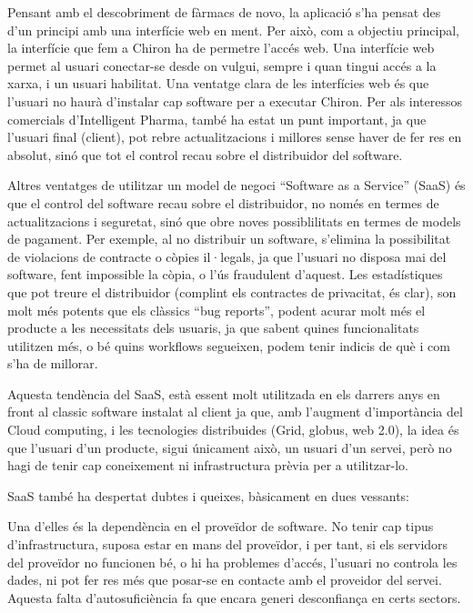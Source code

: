 \documentclass[titlepage,a4paper,12pt]{book}
\begin{document}
Pensant amb el descobriment de fàrmacs de novo, la aplicació s'ha pensat des
d'un principi amb una interfície web en ment.  Per això, com a objectiu
principal, la interfície que fem a Chiron ha de permetre l'accés web.  Una
interfície web permet al usuari conectar-se desde on vulgui, sempre i quan
tingui accés a la xarxa, i un usuari habilitat.  Una ventatge clara de les
interfícies web és que l'usuari no haurà d'instalar cap software per a executar
Chiron.  Per als interessos comercials d'Intelligent Pharma, també ha estat un
punt important, ja que l'usuari  final (client), pot rebre actualitzacions i
millores sense haver de fer res en absolut, sinó que tot el control recau sobre
el distribuidor del software.

Altres ventatges de utilitzar un model de negoci ``Software as a Service''
(SaaS) és que el control del software recau sobre el distribuidor, no només en
termes de actualitzacions i seguretat, sinó que obre noves possiblilitats en
termes de models de pagament.   Per exemple, al no distribuir un software,
	   s'elimina la possibilitat de violacions de contracte o còpies il·legals, ja que
	   l'usuari no disposa mai del software, fent impossible la còpia, o l'ús
	   fraudulent d'aquest.  Les estadístiques que pot treure el distribuidor (complint
			   els contractes de privacitat, és clar), son molt més potents que els clàssics
	   ``bug reports'', podent acurar molt més el producte a les necessitats dels
	   usuaris, ja que sabent quines funcionalitats utilitzen més, o bé quins workflows
	   segueixen, podem tenir indicis de què i com s'ha de millorar.

	   Aquesta tendència del SaaS, està essent molt utilitzada en els darrers anys en
	   front al classic software instalat al client ja que, amb l'augment d'importància
	   del Cloud computing, i les tecnologies distribuides (Grid, globus, web 2.0), la
	   idea és que l'usuari d'un producte, sigui únicament això, un usuari d'un servei,
	   però no hagi de tenir cap coneixement ni infrastructura prèvia per a
	   utilitzar-lo.

	   SaaS també ha despertat dubtes i queixes, bàsicament en dues vessants:

	   Una d'elles és la dependència en el proveïdor de software.  No tenir cap tipus
	   d'infrastructura, suposa estar en mans del proveïdor, i per tant, si els
	   servidors del proveïdor no funcionen bé, o hi ha problemes d'accés, l'usuari
	   no controla les dades, ni pot fer res més que posar-se en contacte amb el
	   proveidor del servei.  Aquesta falta d'autosuficiència fa que encara generi
	   desconfiança en certs sectors.
\end{document}
